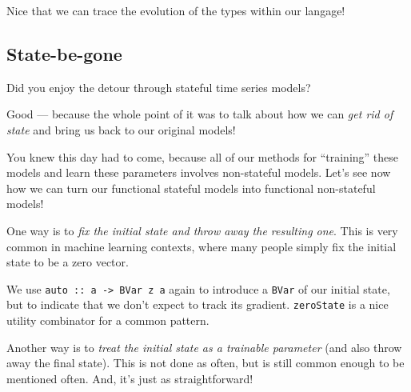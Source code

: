 \documentclass[]{article}
\newenvironment{Shaded}{}{}
\newcommand{\CommentTok}[1]{\textcolor[rgb]{0.38,0.63,0.69}{\textit{#1}}}
\newcommand{\DataTypeTok}[1]{\textcolor[rgb]{0.56,0.13,0.00}{#1}}
\newcommand{\DecValTok}[1]{\textcolor[rgb]{0.25,0.63,0.44}{#1}}
\newcommand{\FunctionTok}[1]{\textcolor[rgb]{0.02,0.16,0.49}{#1}}
\newcommand{\NormalTok}[1]{#1}
\newcommand{\OtherTok}[1]{\textcolor[rgb]{0.00,0.44,0.13}{#1}}
\begin{document}
Nice that we can trace the evolution of the types within our langage!

\hypertarget{state-be-gone}{%
\subsection{State-be-gone}\label{state-be-gone}}

Did you enjoy the detour through stateful time series models?

Good --- because the whole point of it was to talk about how we can \emph{get
rid of state} and bring us back to our original models!

You knew this day had to come, because all of our methods for ``training'' these
models and learn these parameters involves non-stateful models. Let's see now
how we can turn our functional stateful models into functional non-stateful
models!

One way is to \emph{fix the initial state and throw away the resulting one}.
This is very common in machine learning contexts, where many people simply fix
the initial state to be a zero vector.

\begin{Shaded}
\end{Shaded}

We use \texttt{auto\ ::\ a\ -\textgreater{}\ BVar\ z\ a} again to introduce a
\texttt{BVar} of our initial state, but to indicate that we don't expect to
track its gradient. \texttt{zeroState} is a nice utility combinator for a common
pattern.

Another way is to \emph{treat the initial state as a trainable parameter} (and
also throw away the final state). This is not done as often, but is still common
enough to be mentioned often. And, it's just as straightforward!
\end{document}
